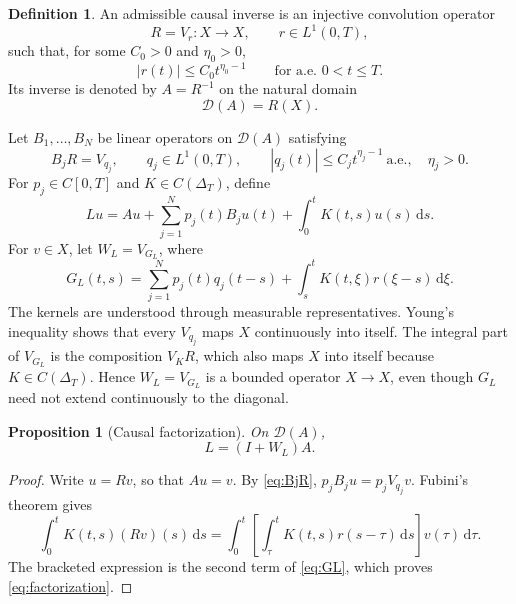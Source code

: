 \documentclass[11pt]{article}
\numberwithin{equation}{section}
\newtheorem{proposition}{Proposition}
\theoremstyle{definition}
\newtheorem{definition}{Definition}
\theoremstyle{remark}
\newcommand{\D}{\mathcal D}
\newcommand{\dd}{\,\mathrm d}
\begin{document}
\begin{definition}
An admissible causal inverse is an injective convolution operator
\begin{equation*}
R=V_r:X\to X,
\qquad r\in L^1(0,T),
\end{equation*}
such that, for some $C_0>0$ and $\eta_0>0$,
\begin{equation*}
|r(t)|\le C_0t^{\eta_0-1}
\qquad\text{for a.e. }0<t\le T.
\end{equation*}
Its inverse is denoted by $A=R^{-1}$ on the natural domain
\begin{equation*}
\D(A)=R(X).
\end{equation*}
\end{definition}

Let $B_1,\ldots,B_N$ be linear operators on $\D(A)$ satisfying
\begin{equation}
B_jR=V_{q_j},
\qquad q_j\in L^1(0,T),
\qquad |q_j(t)|\le C_jt^{\eta_j-1}\ \text{a.e.},
\quad \eta_j>0.
\label{eq:BjR}
\end{equation}
For $p_j\in C[0,T]$ and $K\in C(\Delta_T)$, define
\begin{equation}
Lu=Au+\sum_{j=1}^{N}p_j(t)B_ju(t)+\int_0^tK(t,s)u(s)\dd s.
\label{eq:L}
\end{equation}
For $v\in X$, let $W_L=V_{G_L}$, where
\begin{equation}
G_L(t,s)=\sum_{j=1}^{N}p_j(t)q_j(t-s)
+\int_s^tK(t,\xi)r(\xi-s)\dd\xi.
\label{eq:GL}
\end{equation}
The kernels are understood through measurable representatives. Young's inequality shows that every $V_{q_j}$ maps $X$ continuously into itself. The integral part of $V_{G_L}$ is the composition $V_KR$, which also maps $X$ into itself because $K\in C(\Delta_T)$. Hence $W_L=V_{G_L}$ is a bounded operator $X\to X$, even though $G_L$ need not extend continuously to the diagonal.

\begin{proposition}[Causal factorization]\label{prop:factorization}
On $\D(A)$,
\begin{equation}
L=(I+W_L)A.
\label{eq:factorization}
\end{equation}
\end{proposition}

\begin{proof}
Write $u=Rv$, so that $Au=v$. By \eqref{eq:BjR}, $p_jB_ju=p_jV_{q_j}v$. Fubini's theorem gives
\begin{equation*}
\int_0^tK(t,s)(Rv)(s)\dd s
=\int_0^t\left[\int_\tau^tK(t,s)r(s-\tau)\dd s\right]v(\tau)\dd\tau.
\end{equation*}
The bracketed expression is the second term of \eqref{eq:GL}, which proves \eqref{eq:factorization}.
\end{proof}
\end{document}
